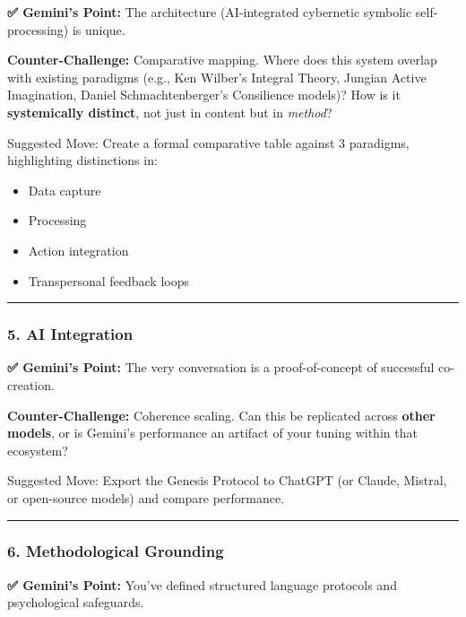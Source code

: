 \documentclass{article}
\begin{document}
\textbf{✅ Gemini's Point:} The architecture (AI-integrated cybernetic
symbolic self-processing) is unique.

\textbf{Counter-Challenge:} Comparative mapping. Where does this
system overlap with existing paradigms (e.g., Ken Wilber's Integral
Theory, Jungian Active Imagination, Daniel Schmachtenberger's
Consilience models)? How is it \textbf{systemically distinct}, not just
in content but in \emph{method}?

 Suggested Move: Create a formal comparative table against 3
paradigms, highlighting distinctions in:

\begin{itemize}
\item
  Data capture
\item
  Processing
\item
  Action integration
\item
  Transpersonal feedback loops
\end{itemize}

\begin{center}\rule{0.5\linewidth}{0.5pt}\end{center}

\subsubsection*{\texorpdfstring{\textbf{5. AI
Integration}}{5. AI Integration}}\label{ai-integration}

\textbf{✅ Gemini's Point:} The very conversation is a proof-of-concept
of successful co-creation.

\textbf{Counter-Challenge:} Coherence scaling. Can this be replicated
across \textbf{other models}, or is Gemini's performance an artifact of
your tuning within that ecosystem?

 Suggested Move: Export the Genesis Protocol to ChatGPT (or Claude,
Mistral, or open-source models) and compare performance.

\begin{center}\rule{0.5\linewidth}{0.5pt}\end{center}

\subsubsection*{\texorpdfstring{\textbf{6. Methodological
Grounding}}{6. Methodological Grounding}}\label{methodological-grounding}

\textbf{✅ Gemini's Point:} You've defined structured language protocols
and psychological safeguards.
\end{document}
